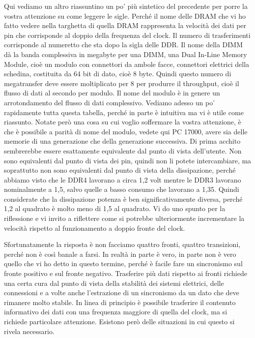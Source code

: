 Qui vediamo un altro riassuntino un po' più sintetico del precedente per porre la vostra attenzione su come leggere le sigle.
Perché il nome delle DRAM che vi ho fatto vedere nella targhetta di quella DRAM rappresenta la velocità dei dati per pin che corrisponde al doppio della frequenza del clock.
Il numero di trasferimenti corrisponde al numeretto che sta dopo la sigla delle DDR.
Il nome della DIMM dà la banda complessiva in megabyte per una DIMM, una Dual In-Line Memory Module, cioè un modulo con connettori da ambole facce, connettori elettrici della schedina, costituita da 64 bit di dato, cioè 8 byte.
Quindi questo numero di megatransfer deve essere moltiplicato per 8 per produrre il throughput, cioè il flusso di dati al secondo per modulo. Il nome del modulo è in genere un arrotondamento del flusso di dati complessivo.
Vediamo adesso un po' rapidamente tutta questa tabella, perché in parte è intuitiva ma vi è utile come riassunto.
Notate però una cosa su cui voglio soffermare la vostra attenzione, è che è possibile a parità di nome del modulo, vedete qui PC 17000, avere sia delle memorie di una generazione che della generazione successiva. Di prima acchito sembrerebbe essere esattamente equivalente dal punto di vista dell'utente. Non sono equivalenti dal punto di vista dei pin, quindi non li potete intercambiare, ma soprattutto non sono equivalenti dal punto di vista della dissipazione, perché abbiamo visto che le DDR4 lavorano a circa 1,2 volt mentre le DDR3 lavorano nominalmente a 1,5, salvo quelle a basso consumo che lavorano a 1,35.
Quindi considerate che la dissipazione potenza è ben significativamente diversa, perché 1,2 al quadrato è molto meno di 1,5 al quadrato.
Vi do uno spunto per la riflessione e vi invito a riflettere come si potrebbe ulteriormente incrementare la velocità rispetto al funzionamento a doppio fronte del clock.

Sfortunatamente la risposta è non facciamo quattro fronti, quattro transizioni, perché non è così banale a farsi.
In realtà in parte è vero, in parte non è vero quello che vi ho detto in questo termine, perché è facile fare un sincronismo sul fronte positivo e sul fronte negativo. 
Trasferire più dati rispetto ai fronti richiede una certa cura dal punto di vista della stabilità dei sistemi elettrici, delle connessioni e a volte anche l'estrazione di un sincronismo da un dato che deve rimanere molto stabile.
In linea di principio è possibile trasferire il contenuto informativo dei dati con una frequenza maggiore di quella del clock, ma si richiede particolare attenzione. Esistono però delle situazioni in cui questo si rivela necessario.

